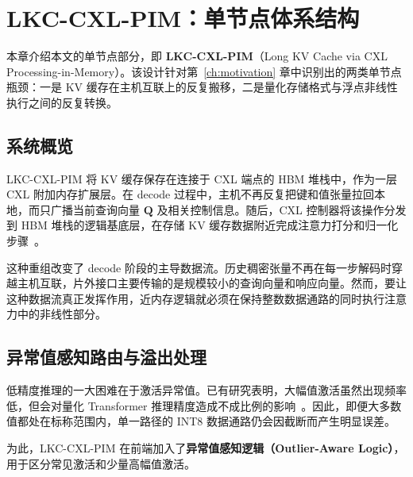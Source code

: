 \chapter{LKC-CXL-PIM：单节点体系结构}
\label{ch:inlu_architecture}

本章介绍本文的单节点部分，即 \textbf{LKC-CXL-PIM}（Long KV Cache via CXL Processing-in-Memory）。该设计针对第~\ref{ch:motivation} 章中识别出的两类单节点瓶颈：一是 KV 缓存在主机互联上的反复搬移，二是量化存储格式与浮点非线性执行之间的反复转换。

\section{系统概览}

LKC-CXL-PIM 将 KV 缓存保存在连接于 CXL 端点的 HBM 堆栈中，作为一层 CXL 附加内存扩展层。在 decode 过程中，主机不再反复把键和值张量拉回本地，而只广播当前查询向量 $\mathbf{Q}$ 及相关控制信息。随后，CXL 控制器将该操作分发到 HBM 堆栈的逻辑基底层，在存储 KV 缓存数据附近完成注意力打分和归一化步骤~\cite{attentionlego}。

这种重组改变了 decode 阶段的主导数据流。历史稠密张量不再在每一步解码时穿越主机互联，片外接口主要传输的是规模较小的查询向量和响应向量。然而，要让这种数据流真正发挥作用，近内存逻辑就必须在保持整数数据通路的同时执行注意力中的非线性部分。

\section{异常值感知路由与溢出处理}

低精度推理的一大困难在于激活异常值。已有研究表明，大幅值激活虽然出现频率低，但会对量化 Transformer 推理精度造成不成比例的影响~\cite{llm_outliers}。因此，即便大多数值都处在标称范围内，单一路径的 INT8 数据通路仍会因截断而产生明显误差。

为此，LKC-CXL-PIM 在前端加入了\textbf{异常值感知逻辑（Outlier-Aware Logic）}，用于区分常见激活和少量高幅值激活。

